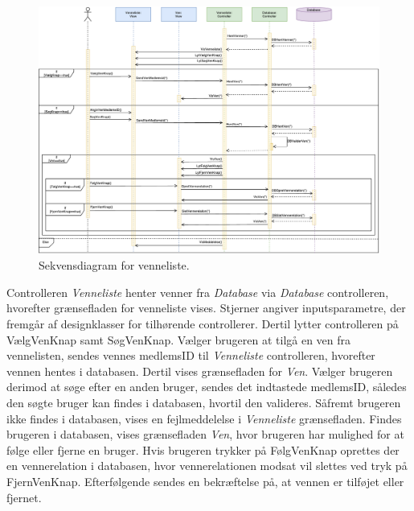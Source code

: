 \begin{figure} [H]
\centering
\includegraphics[width=1.55\textwidth, angle=90]{figures/Sek/SEKVenneliste}
\caption{Sekvensdiagram for venneliste.}
\label{fig:SEKVenneliste}
\end{figure}

\noindent
Controlleren \textit{Venneliste} henter venner fra \textit{Database} via \textit{Database} controlleren, hvorefter grænsefladen for venneliste vises. Stjerner angiver inputsparametre, der fremgår af designklasser for tilhørende controllerer. 
Dertil lytter controlleren på VælgVenKnap samt SøgVenKnap. Vælger brugeren at tilgå en ven fra vennelisten, sendes vennes medlemsID til \textit{Venneliste} controlleren, hvorefter vennen hentes i databasen. Dertil vises grænsefladen for \textit{Ven}. Vælger brugeren derimod at søge efter en anden bruger, sendes det indtastede medlemsID, således den søgte bruger kan findes i databasen, hvortil den valideres. Såfremt brugeren ikke findes i databasen, vises en fejlmeddelelse i \textit{Venneliste} grænsefladen. Findes brugeren i databasen, vises grænsefladen \textit{Ven}, hvor brugeren har mulighed for at følge eller fjerne en bruger. Hvis brugeren trykker på FølgVenKnap oprettes der en vennerelation i databasen, hvor vennerelationen modsat vil slettes ved tryk på FjernVenKnap. Efterfølgende sendes en bekræftelse på, at vennen er tilføjet eller fjernet. 




